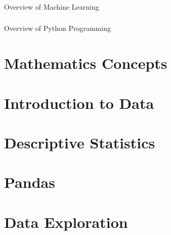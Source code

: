 

 \begin{frame}[fragile]\frametitle{}
 \begin{center}
 {\Large Overview of Machine Learning}
 \end{center}
 \end{frame}


 
 
 

 \begin{frame}[fragile]\frametitle{}
 \begin{center}
 {\Large Overview of Python Programming}
 \end{center}
 \end{frame}

 




 \section[Maths]{Mathematics Concepts}
 

 \section[DataIntro]{Introduction to Data}
 
 



 \section[Descr]{Descriptive Statistics}
 

 \section[Pandas]{Pandas}
 


 \section[EDA]{Data Exploration}
 

